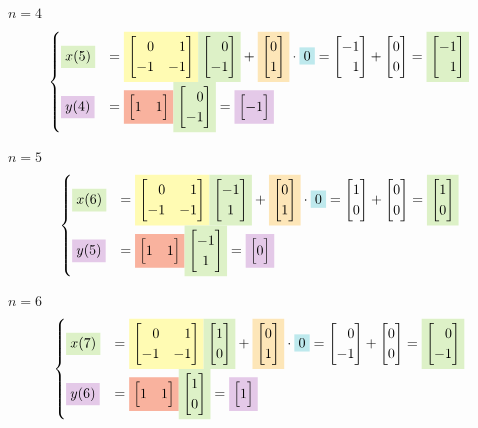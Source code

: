 \documentclass[12pt]{scrartcl}
\newcommand{\macierz}[1]{\begin{bmatrix}#1\end{bmatrix}}
\newcommand{\bgcolor}[2]{\colorbox{#1!30}{#2}}
\newcommand{\rownaniezmacierzax}[5]{
	\bgcolor{YellowGreen}{#1} &= \bgcolor{Yellow}{#2}\bgcolor{YellowGreen}{#3} + \bgcolor{Dandelion}{#4}\cdot\bgcolor{Turquoise}{#5}
}
\newcommand{\rownaniezmacierzaysimple}[3]{
	\bgcolor{Orchid}{#1} &= \bgcolor{Red}{#2}\bgcolor{YellowGreen}{#3}
}
\newcommand{\m}{\phantom{-}}
\begin{document}
$n=4$\\
$$
\begin{cases}
\rownaniezmacierzax{$x(5)$}
{$\vA$}							%
{$\macierz{\m0 \\ -1}$}			%
{$\macierz{0 \\ 1}$}			%
{0}								%
=\macierz{-1 \\ \m1} + \macierz{0 \\ 0}
=\bgcolor{YellowGreen}{$\macierz{-1 \\ \m1}$}\\

\rownaniezmacierzaysimple{$y(4)$}
{$\macierz{1 & 1}$}				%
{$\macierz{\m0 \\ -1}$}			%
= \bgcolor{Orchid}{$\macierz{-1}$}
\end{cases}
$$

$n=5$\\
$$
\begin{cases}
\rownaniezmacierzax{$x(6)$}
{$\vA$}							%
{$\macierz{-1 \\ 1}$}			%
{$\macierz{0 \\ 1}$}			%
{0}								%
=\macierz{1 \\ 0} + \macierz{0 \\ 0}
=\bgcolor{YellowGreen}{$\macierz{1 \\ 0}$}\\

\rownaniezmacierzaysimple{$y(5)$}
{$\macierz{1 & 1}$}				%
{$\macierz{-1 \\ 1}$}			%
= \bgcolor{Orchid}{$\macierz{0}$}
\end{cases}
$$

$n=6$\\
$$
\begin{cases}
\rownaniezmacierzax{$x(7)$}
{$\vA$}							%
{$\macierz{1 \\ 0}$}			%
{$\macierz{0 \\ 1}$}			%
{0}								%
=\macierz{\m0 \\ -1} + \macierz{0 \\ 0}
=\bgcolor{YellowGreen}{$\macierz{\m0 \\ -1}$}\\

\rownaniezmacierzaysimple{$y(6)$}
{$\macierz{1 & 1}$}				%
{$\macierz{1 \\ 0}$}			%
= \bgcolor{Orchid}{$\macierz{1}$}
\end{cases}
$$
\end{document}
